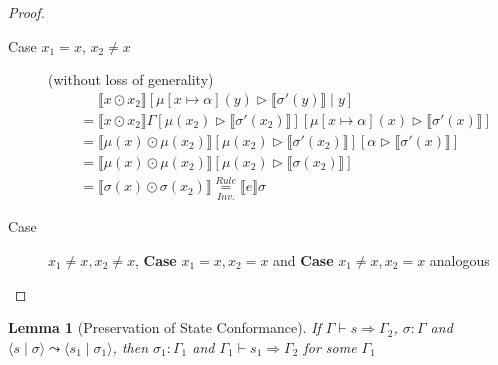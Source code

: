 \documentclass[twoside, english]{sdqthesis}
\newcommand{\tuple}[2]{\langle #1 \mid #2 \rangle}
\newcommand{\bbracket}[1]{\llbracket #1 \rrbracket}
\newcommand{\tr}[0]{\triangleright}
\newtheorem{lemma}[theorem]{Lemma}
\theoremstyle{definition}
\begin{document}
\begin{proof}
\begin{description}
\begin{description}
\begin{description}
              \begin{description}
                \item[Case $x_1=x$, $x_2 \neq x$] (without loss of generality)
                \begin{align*}
                     &\phantom{=} \bbracket{x \odot x_2}[\mu[x\mapsto \alpha](y) \tr \bbracket{\sigma'(y)} \mid y]
                  \\ &=\bbracket{x \odot x_2}\Gamma[\mu(x_2)\tr \bbracket{\sigma'(x_2)}][\mu[x \mapsto \alpha](x) \tr \bbracket{\sigma'(x)}]
                  \\ &=\bbracket{\mu(x) \odot \mu(x_2)}[\mu(x_2)\tr \bbracket{\sigma'(x_2)}][\alpha \tr \bbracket{\sigma'(x)}]
                  \\ &=\bbracket{\mu(x) \odot \mu(x_2)}[\mu(x_2)\tr \bbracket{\sigma(x_2)}]
                  \\ &=\bbracket{\sigma(x) \odot \sigma(x_2)} \underset{Inv.}{\overset{Rule}{=}} \bbracket{e}\sigma
                \end{align*}
                \item[Case] $x_1\neq x, x_2 \neq x$, \textbf{Case} $x_1 = x, x_2 = x$ and \textbf{Case} $x_1 \neq x, x_2 = x$ analogous
              \end{description}
          \end{description}
      \end{description}
  \end{description}
\end{proof}


\begin{lemma}[Preservation of State Conformance]
  If $\Gamma \vdash s \Rightarrow \Gamma_2$, $\sigma : \Gamma$ and $\tuple{s}{\sigma} \leadsto \tuple{s_1}{\sigma_1}$, then  $\sigma_1 : \Gamma_1$ and $\Gamma_1 \vdash s_1 \Rightarrow \Gamma_2$ for some $\Gamma_1$
\end{lemma}
\end{document}

